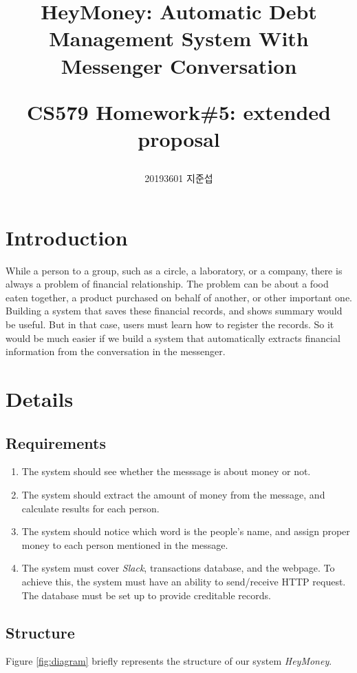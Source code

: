 \documentclass[11pt]{article}
\author{20193601 지준섭}
\title{HeyMoney: Automatic Debt Management System With Messenger Conversation \\
\begin{large}
  CS579 Homework\#5: extended proposal
\end{large}}
\begin{document}
\maketitle


\section{Introduction}

While a person to a group, such as a circle, a laboratory, or a company,
there is always a problem of financial relationship.
The problem can be about a food eaten together,
a product purchased on behalf of another, or other important one.
Building a system that saves these financial records,
and shows summary would be useful.
But in that case, users must learn how to register the records.
So it would be much easier if we build a system that
automatically extracts financial information from the conversation in the messenger.

\section{Details}

\subsection{Requirements}

\begin{enumerate}
  \item The system should see whether the messsage is about money or not.
  \item The system should extract the amount of money from the message,
    and calculate results for each person.
  \item The system should notice which word is the people's name, and assign proper money to each person mentioned in the message.
  \item The system must cover \textit{Slack}, transactions database, and the webpage.
    To achieve this, the system must have an ability to send/receive HTTP request.
    The database must be set up to provide creditable records.
\end{enumerate}

\subsection{Structure}

Figure \ref{fig:diagram} briefly represents the structure of our system \textit{HeyMoney}.
\end{document}
